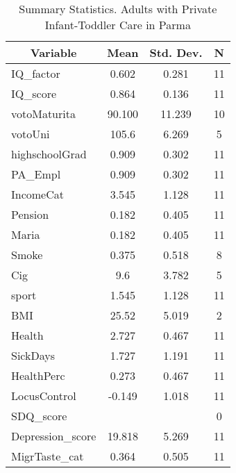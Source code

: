 
\begin{table}[htbp]\centering \caption{Summary Statistics. Adults with Private Infant-Toddler Care in Parma \label{bothAdultasiloPrivParma}}
\begin{tabular}{l c c  c}\hline\hline
\multicolumn{1}{c}{\textbf{Variable}} & \textbf{Mean}
 & \textbf{Std. Dev.} & \textbf{N}\\ \hline
IQ\_factor & 0.602 & 0.281  & 11\\
IQ\_score & 0.864 & 0.136  & 11\\
votoMaturita & 90.100 & 11.239  & 10\\
votoUni & 105.6 & 6.269  & 5\\
highschoolGrad & 0.909 & 0.302  & 11\\
PA\_Empl & 0.909 & 0.302  & 11\\
IncomeCat & 3.545 & 1.128  & 11\\
Pension & 0.182 & 0.405  & 11\\
Maria & 0.182 & 0.405  & 11\\
Smoke & 0.375 & 0.518  & 8\\
Cig & 9.6 & 3.782  & 5\\
sport & 1.545 & 1.128  & 11\\
BMI & 25.52 & 5.019  & 2\\
Health & 2.727 & 0.467  & 11\\
SickDays & 1.727 & 1.191  & 11\\
HealthPerc & 0.273 & 0.467  & 11\\
LocusControl & -0.149 & 1.018  & 11\\
SDQ\_score &  &   & 0\\
Depression\_score & 19.818 & 5.269  & 11\\
MigrTaste\_cat & 0.364 & 0.505  & 11\\
\hline\end{tabular}
\end{table}
